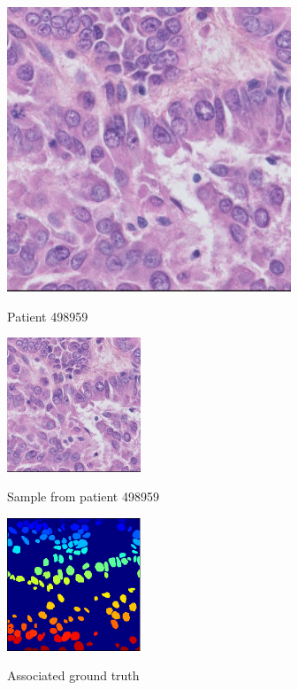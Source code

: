 \documentclass{article}
\begin{document}
\begin{figure}[htb]

\begin{minipage}[b]{1.0\linewidth}
  \centering
  \centerline{\includegraphics[width=8.5cm]{RGB_1}}
  \centerline{Patient 498959}\medskip
\end{minipage}
%
\begin{minipage}[b]{.48\linewidth}
  \centering
  \centerline{\includegraphics[width=4.0cm]{RGB_1}}
  \centerline{Sample from patient 498959}\medskip
\end{minipage}
\hfill
\begin{minipage}[b]{0.48\linewidth}
  \centering
  \centerline{\includegraphics[width=4.0cm]{GT_1}}
  \centerline{Associated ground truth}\medskip
\end{minipage}

\end{figure}
\end{document}
